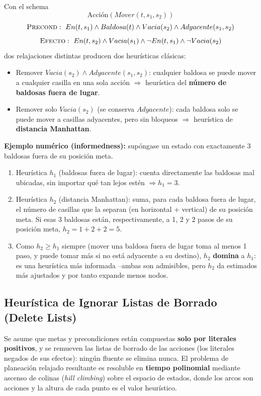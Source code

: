 \begin{example}[8-puzzle]
Con el schema
\[
    \text{Acci\'on}(Mover(t,s_1,s_2))
\]
\[
    \textsc{Precond}:\ En(t,s_1)\land Baldosa(t)\land Vacia(s_2)\land Adyacente(s_1,s_2)
\]
\[
    \textsc{Efecto}:\ En(t,s_2)\land Vacia(s_1)\land \neg En(t,s_1)\land \neg Vacia(s_2)
\]
dos relajaciones distintas producen dos heurísticas clásicas:
\begin{itemize}
    \item Remover $Vacia(s_2)\land Adyacente(s_1,s_2)$: cualquier baldosa se puede mover a cualquier
    casilla en una sola acción $\Rightarrow$ heurística del \textbf{número de baldosas fuera de
    lugar}.
    \item Remover solo $Vacia(s_2)$ (se conserva $Adyacente$): cada baldosa solo se puede mover a
    casillas adyacentes, pero sin bloqueos $\Rightarrow$ heurística de \textbf{distancia Manhattan}.
\end{itemize}

\textbf{Ejemplo numérico (informedness):} supóngase un estado con exactamente 3 baldosas fuera de su
posición meta.
\begin{enumerate}
    \item Heurística $h_1$ (baldosas fuera de lugar): cuenta directamente las baldosas mal
    ubicadas, sin importar qué tan lejos estén $\Rightarrow h_1 = 3$.
    \item Heurística $h_2$ (distancia Manhattan): suma, para cada baldosa fuera de lugar, el número
    de casillas que la separan (en horizontal + vertical) de su posición meta. Si esas 3 baldosas
    están, respectivamente, a 1, 2 y 2 pasos de su posición meta, $h_2 = 1+2+2 = 5$.
    \item Como $h_2 \ge h_1$ siempre (mover una baldosa fuera de lugar toma al menos 1 paso, y puede
    tomar más si no está adyacente a su destino), $h_2$ \textbf{domina} a $h_1$: es una heurística
    más informada --ambas son admisibles, pero $h_2$ da estimados más ajustados y por tanto expande
    menos nodos.
\end{enumerate}
\end{example}

\subsection{Heurística de Ignorar Listas de Borrado (Delete Lists)}

\begin{definition}
Se asume que metas y precondiciones están compuestas \textbf{solo por literales positivos}, y se
remueven las listas de borrado de las acciones (los literales negados de sus efectos): ningún
fluente se elimina nunca. El problema de planeación relajado resultante es resoluble en
\textbf{tiempo polinomial} mediante ascenso de colinas (\textit{hill climbing}) sobre el espacio de
estados, donde los arcos son acciones y la altura de cada punto es el valor heurístico.
\end{definition}

